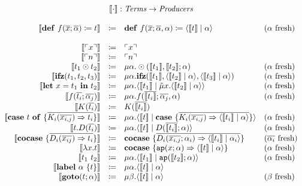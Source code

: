 \[
  \begin{array}{rcll}
    \multicolumn{4}{c}{\translate{\cdot} : \emph{Terms} \rightarrow \emph{Producers}}\\
    \\
    \translate{\defi{f(\overline{x}; \overline{\alpha})}{t}} & \coloneq & \defi{f(\overline{x}; \overline{\alpha}, \alpha)}{\cut{\translate{t}}{\alpha}} & \fresh{\alpha}\\
  \quad \\
    \translate{\lit{x}} & \coloneq & \lit{x} & \\
    \translate{\lit{n}} & \coloneq & \lit{n} & \\
    \translate{t_1 \odot t_2} & \coloneq & \mu\alpha.\odot(\translate{t_1}, \translate{t_2}; \alpha) & \fresh{\alpha}\\
    \translate{\ifz{t_1}{t_2}{t_3}} & \coloneq & \mu\alpha.\ifz{\translate{t_1}}{\cut{\translate{t_2}}{\alpha}}{\cut{\translate{t_3}}{\alpha}} & \fresh{\alpha}\\
    \translate{\letin{x}{t_1}{t_2}} & \coloneq & \mu\alpha.\cut{\translate{t_1}}{\tilde{\mu}x.\cut{\translate{t_2}}{\alpha}} & \fresh{\alpha}\\
    \translate{f(\overline{t_i}; \overline{\alpha_j})} & \coloneq & \mu\alpha.f(\overline{\translate{t_i}}; \overline{\alpha_j},\alpha) & \fresh{\alpha}\\
    \translate{K(\overline{t_i})} & \coloneq & K(\overline{\translate{t_i}}) & \\
    \translate{\caseof{t}{\overline{K_i(\overline{x_{i,j}}) \Rightarrow t_i}}} & \coloneq & \mu\alpha.\cut{\translate{t}}{\case{\overline{K_i(\overline{x_{i,j}}) \Rightarrow \cut{\translate{t_i}}{\alpha}}}} & \fresh{\alpha}\\
    \translate{t.D(\overline{t_i})} & \coloneq & \mu\alpha.\cut{\translate{t}}{D(\overline{\translate{t_i}}; \alpha)} & \fresh{\alpha}\\
    \translate{\cocase{\overline{D_i(\overline{x_{ij}})\Rightarrow t_i}}} & \coloneq & \cocase{\overline{D_i(\overline{x_{i,j}}; \alpha_i) \Rightarrow \cut{\translate{t_i}}{\alpha_i}}} & \fresh{\overline{\alpha_i}}\\
    \translate{\lambda x.t} & \coloneq & \cocase{\mathtt{ap}(x; \alpha) \Rightarrow \cut{\translate{t}}{\alpha}} & \fresh{\alpha}\\
    \translate{t_1\ t_2} & \coloneq & \mu\alpha.\cut{\translate{t_1}}{\mathtt{ap}(\translate{t_2}; \alpha)} & \fresh{\alpha}\\
    \translate{\lab{\alpha}{t}} & \coloneq & \mu\alpha.\cut{\translate{t}}{\alpha} & \\
    \translate{\goto{t}{\alpha}} & \coloneq & \mu\beta.\cut{\translate{t}}{\alpha} & \fresh{\beta}
  \end{array}
\]

